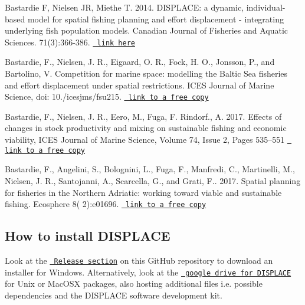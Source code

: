 \begin{DoxyItemize}
\item Bastardie F, Nielsen JR, Miethe T. 2014. D\+I\+S\+P\+L\+A\+CE\+: a dynamic, individual-\/based model for spatial fishing planning and effort displacement -\/ integrating underlying fish population models. Canadian Journal of Fisheries and Aquatic Sciences. 71(3)\+:366-\/386. \href{https://www.nrcresearchpress.com/doi/full/10.1139/cjfas-2013-0126\#.XJs-ubh7nmE}{\texttt{ link here}}
\item Bastardie, F., Nielsen, J. R., Eigaard, O. R., Fock, H. O., Jonsson, P., and Bartolino, V. Competition for marine space\+: modelling the Baltic Sea fisheries and effort displacement under spatial restrictions. I\+C\+ES Journal of Marine Science, doi\+: 10./icesjms/fsu215. \href{https://academic.oup.com/icesjms/article/72/3/824/701817}{\texttt{ link to a free copy}}
\item Bastardie, F., Nielsen, J. R., Eero, M., Fuga, F. Rindorf., A. 2017. Effects of changes in stock productivity and mixing on sustainable fishing and economic viability, I\+C\+ES Journal of Marine Science, Volume 74, Issue 2, Pages 535–551 \href{https://academic.oup.com/icesjms/article/74/2/535/2669542}{\texttt{ link to a free copy}}
\item Bastardie, F., Angelini, S., Bolognini, L., Fuga, F., Manfredi, C., Martinelli, M., Nielsen, J. R., Santojanni, A., Scarcella, G., and Grati, F.. 2017. Spatial planning for fisheries in the Northern Adriatic\+: working toward viable and sustainable fishing. Ecosphere 8( 2)\+:e01696. \href{https://esajournals.onlinelibrary.wiley.com/doi/full/10.1002/ecs2.1696}{\texttt{ link to a free copy}}
\end{DoxyItemize}

\subsection*{How to install D\+I\+S\+P\+L\+A\+CE}

Look at the \href{https://github.com/frabas/DISPLACE_GUI/releases}{\texttt{ Release section}} on this Git\+Hub repository to download an installer for Windows. Alternatively, look at the \href{https://drive.google.com/drive/folders/0ByuO_4j-1PxtfnZBblpQNmh2a2Z4SmpkRC16T1kwR0t1RWUyOVUxdHlEZzZwZWVpaVJac00}{\texttt{ google drive for D\+I\+S\+P\+L\+A\+CE}} for Unix or Mac\+O\+SX packages, also hosting additional files i.\+e. possible dependencies and the D\+I\+S\+P\+L\+A\+CE software development kit.

